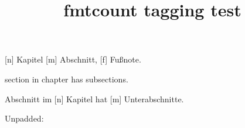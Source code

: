 \documentclass{report}
\title{fmtcount tagging test}
\newcounter{test} \setcounter{test}{29}
\begin{document}
[n] Kapitel [m]
Abschnitt, [f] Fußnote.

 section in 
chapter has  subsections.
  \par   {}%
 Abschnitt im [n]
Kapitel hat [m] Unterabschnitte.

\padzeroes[4]
    \par
Unpadded: \padzeroes[0]
   
\end{document}
